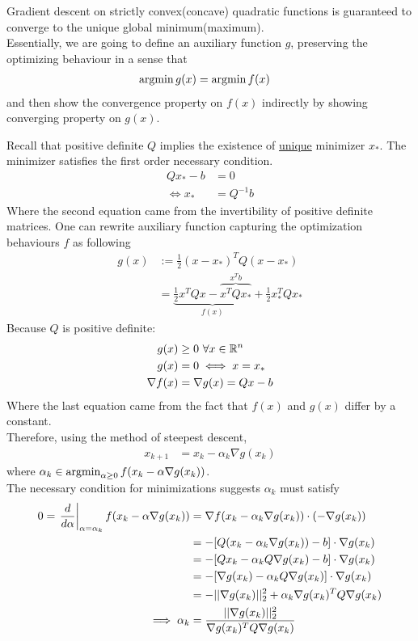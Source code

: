 \documentclass{article}
\begin{document}
	\begin{proposition}
		Gradient descent on  strictly convex(concave) quadratic functions is guaranteed to converge to the unique global minimum(maximum). \\
		Essentially, we are going to define an auxiliary function $g$, preserving the optimizing behaviour in a sense that
		\begin{align}
			\operatorname*{argmin} g(x) &= \operatorname*{argmin} f(x)
		\end{align}
		and then show the convergence property on $f(x)$ indirectly by showing converging property on $g(x)$.
	\end{proposition}
	
	\begin{lemma}
		Recall that positive definite $Q$ implies the existence of \ul{unique} minimizer $x_*$. The minimizer satisfies the first order necessary condition.
		\begin{align}
			Q x_* - b &= 0 \\
			\iff x_* &= Q^{-1} b
		\end{align}
		Where the second equation came from the invertibility of positive definite matrices.
		One can rewrite auxiliary function capturing the optimization behaviours $f$ as following 
		\begin{align}
			g(x) &:= \frac{1}{2} (x - x_*)^T Q (x - x_*) \\
			&= \underbrace{\frac{1}{2} x^T Q x - \overbrace{x^T Q x_*}^{x^T b}}_{f(x)} + \frac{1}{2} x_*^T Q x_*
		\end{align}
		Because $Q$ is positive definite:
		\begin{align}
			g(x) &\geq 0\ \forall x \in \mathbb{R}^n \\
			g(x) &= 0 \iff x = x_*\\
			\nabla f(x) &= \nabla g(x) = Q x - b
		\end{align}
		Where the last equation came from the fact that $f(x)$ and $g(x)$ differ by a constant.\\
		Therefore, using the method of steepest descent,
		\begin{align}
			x_{k+1} &= x_k - \alpha_k \nabla g(x_k)
		\end{align}
		where $\alpha_k \in \operatorname*{argmin}_{\alpha \geq 0}f(x_k - \alpha \nabla g(x_k))$. \\
		The necessary condition for minimizations suggests $\alpha_k$ must satisfy
		\begin{align}
			0 = \left. \frac{d}{d\alpha}\right|_{\alpha = \alpha_k} f(x_k - \alpha \nabla g(x_k)) 
			&= \nabla f(x_k - \alpha_k \nabla g(x_k)) \cdot (-\nabla g(x_k))\\
			&= - [Q(x_k - \alpha_k \nabla g(x_k)) - b] \cdot \nabla g(x_k) \\
			&= - [Qx_k - \alpha_k Q \nabla g(x_k) - b] \cdot \nabla g(x_k) \\
			&= - [\nabla g(x_k) - \alpha_k Q \nabla g(x_k)] \cdot \nabla g(x_k) \\
			&= - \vert \vert {\nabla g(x_k)} \vert \vert_2^2 + \alpha_k \nabla g(x_k)^T Q \nabla g(x_k) \\
			\implies \alpha_k &= \frac{\vert \vert {\nabla g(x_k)} \vert \vert_2^2}{\nabla g(x_k)^T Q \nabla g(x_k)}
		\end{align}
	\end{lemma}
	
\end{document}
